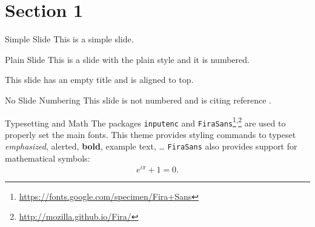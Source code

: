 
\section{Section 1} %


\begin{frame}{Simple Slide}
	This is a simple slide.
\end{frame}


\begin{frame}[plain]{Plain Slide}
	This is a slide with the plain style and it is numbered.
\end{frame}


\begin{frame}[t]
	This slide has an empty title and is aligned to top.
\end{frame}


\begin{frame}[noframenumbering]{No Slide Numbering}
	This slide is not numbered and is citing reference \cite{knuth.1984a}.
\end{frame}


\begin{frame}{Typesetting and Math}
	The packages \texttt{inputenc} and \texttt{FiraSans}\footnote{\url{https://fonts.google.com/specimen/Fira+Sans}}\textsuperscript{,}\footnote{\url{http://mozilla.github.io/Fira/}} are used to properly set the main fonts.
	\vfill
	This theme provides styling commands to typeset \emph{emphasized}, \alert{alerted}, \textbf{bold}, \textcolor{example}{example text}, \dots
	\vfill
	\texttt{FiraSans} also provides support for mathematical symbols:
	\begin{equation*}
		e^{i\pi} + 1 = 0.
	\end{equation*}
\end{frame}


